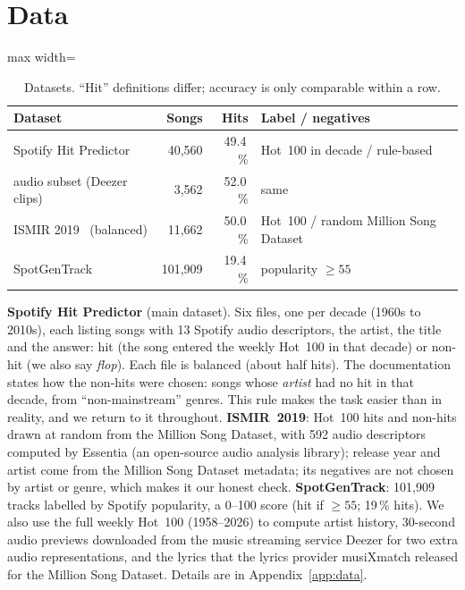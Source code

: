 \documentclass[conference]{IEEEtran}
\begin{document}
\section{Data}

\begin{table}[t]
\centering
\caption{Datasets. ``Hit'' definitions differ; accuracy is only comparable within a row.}
\label{tab:data}
\footnotesize
\setlength{\tabcolsep}{3pt}
\begin{adjustbox}{max width=\columnwidth}
\begin{tabular}{@{}lrrl@{}}
\toprule
Dataset & Songs & Hits & Label / negatives \\
\midrule
Spotify Hit Predictor~\cite{ansari2020dataset} & 40{,}560 & 49.4\,\% & Hot~100 in decade / rule-based \\
\quad audio subset (Deezer clips) & 3{,}562 & 52.0\,\% & same \\
ISMIR 2019~\cite{zangerle2019hit} (balanced) & 11{,}662 & 50.0\,\% & Hot~100 / random Million Song Dataset \\
SpotGenTrack~\cite{martingutierrez2020multimodal} & 101{,}909 & 19.4\,\% & popularity $\geq 55$ \\
\bottomrule
\end{tabular}
\end{adjustbox}
\end{table}

\textbf{Spotify Hit Predictor} (main dataset). Six files, one per decade (1960s to 2010s), each listing songs
with 13 Spotify audio descriptors, the artist, the title and the answer: hit (the song entered the weekly Hot~100
in that decade) or non-hit (we also say \emph{flop}). Each file is balanced (about half hits). The documentation states how the non-hits were
chosen: songs whose \emph{artist} had no hit in that decade, from ``non-mainstream'' genres. This rule makes the
task easier than in reality, and we return to it throughout. \textbf{ISMIR~2019}: Hot~100 hits and non-hits drawn at
random from the Million Song Dataset, with 592 audio descriptors computed by Essentia (an open-source audio
analysis library); release year and artist come from the Million Song Dataset metadata; its negatives are not chosen by artist
or genre, which makes it our honest check. \textbf{SpotGenTrack}: 101{,}909 tracks labelled by Spotify popularity, a 0--100 score (hit if
$\geq55$; 19\,\% hits). We also use the full weekly Hot~100 (1958--2026) to compute artist history, 30-second audio previews downloaded from the music streaming service Deezer for
two extra audio representations, and the lyrics that the lyrics provider musiXmatch released for the Million Song
Dataset. Details are in Appendix~\ref{app:data}.
\end{document}
